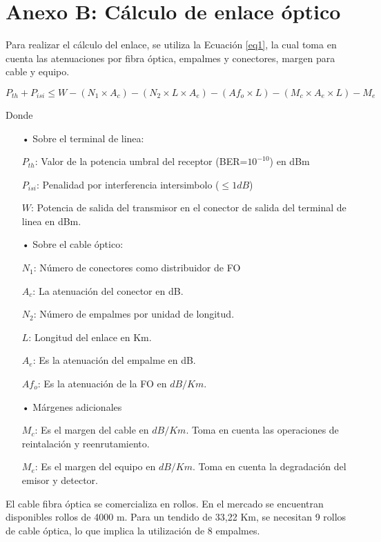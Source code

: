 \section{Anexo B: Cálculo de enlace óptico}
Para realizar el cálculo del enlace, se utiliza la Ecuación \ref{eq1}, la cual toma en cuenta las atenuaciones por fibra óptica, empalmes y conectores, margen para cable y equipo.

\begin{equation}\label{eq1}
P_{th}+P_{isi}\leq W-(N_1\times A_c)-(N_2\times L\times A_e)-(Af_o\times L)-(M_c\times A_e\times L)-M_e
\end{equation}

Donde

\begin{enumerate}

\item[•] Sobre el terminal de linea:

$P_{th}$: Valor de la potencia umbral del receptor (BER=$10^{-10}$) en dBm

$P_{isi}$: Penalidad por interferencia intersimbolo ($\leq 1dB$)

$W$: Potencia de salida del transmisor en el conector de salida del terminal de linea en dBm.

\item[•] Sobre el cable óptico:

$N_1$: Número de conectores como distribuidor de FO

$A_c$: La atenuación del conector en dB.

$N_2$: Número de empalmes por unidad de longitud.

$L$: Longitud del enlace en Km.

$A_e$: Es la atenuación del empalme en dB.

$Af_o$: Es la atenuación de la FO en $dB/Km$.


\item[•] Márgenes adicionales

$M_c$: Es el margen del cable en $dB/Km$. Toma en cuenta las operaciones de reintalación y reenrutamiento.

$M_e$: Es el margen del equipo en $dB/Km$. Toma en cuenta la degradación del emisor y detector.  



\end{enumerate}

El cable fibra óptica se comercializa en rollos. En el mercado se encuentran disponibles rollos de 4000 m. Para un tendido de 33,22 Km, se necesitan 9 rollos de cable óptica, lo que implica la utilización de 8 empalmes. 


